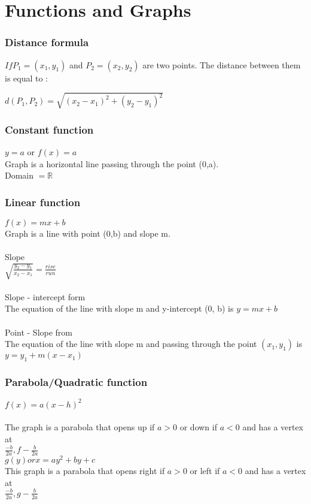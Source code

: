 \documentclass[10pt,onecolumn]{article}
\begin{document}
\part{Functions and Graphs}

\section{Distance formula}
\(If P_1 = (x_1, y_1) \) and \(P_2 = (x_2, y_2)\) are two points. The distance between them is equal to : \\
\begin{center}
\(d(P_1, P_2) = \sqrt{(x_2 - x_1)^2 + (y_2 - y_1)^2} \)
\end{center}

\section{Constant function}
\(y = a\) or \(f(x) = a \) \\ 
Graph is a horizontal line passing through the point (0,a). \\
Domain \(= \mathbb{R}\)

\section{Linear function}
\(f(x) = mx + b \) \\
Graph is a line with point (0,b) and slope m. \\\\
Slope \\
\(\sqrt{\frac{y_2 - y_1}{x_2 - x_1}} = \frac{rise}{run}\) \\\\
Slope - intercept form \\
The equation of the line with slope m and y-intercept (0, b) is 
\(y = mx + b \) \\\\
Point - Slope from \\
The equation of the line with slope m and passing through the point \((x_1, y_1)\) is \\
\(y = y_1 + m(x - x_1) \)

\section{Parabola/Quadratic function}
\(f(x) = a(x - h)^2 \) \\\\
The graph is a parabola that opens up if \(a > 0\) or down if \(a < 0\) and has a vertex at \\
\(\frac{-b}{2a}, f - \frac{b}{2a} \) \\
\(g(y) or x = ay^2 + by + c \) \\
This graph is a parabola that opens right if \(a > 0\) or left  if \(a < 0\) and has a vertex at \\
\(\frac{-b}{2a}, g - \frac{b}{2a} \)
\end{document}
